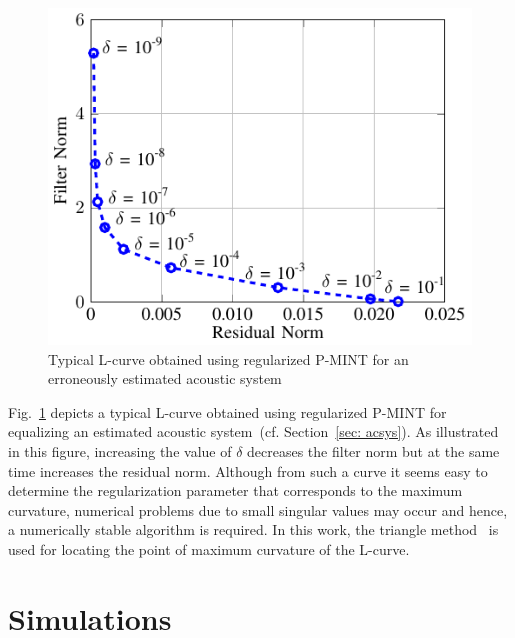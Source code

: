 \documentclass[10pt]{IEEEtran}
\begin{document}
\begin{figure}[t!]
  \centering
  \includegraphics[scale=0.9]{figures/lcurve_ex.pdf}
  \caption{Typical L-curve obtained using regularized P-MINT for an erroneously estimated acoustic system}
  \label{fig: lcurveex}
\end{figure}
Fig.~\ref{fig: lcurveex} depicts a typical L-curve obtained using regularized P-MINT for equalizing an estimated acoustic system~(cf. Section~\ref{sec: acsys}).
As illustrated in this figure, increasing the value of $\delta$ decreases the filter norm but at the same time increases the residual norm.
Although from such a curve it seems easy to determine the regularization parameter that corresponds to the maximum curvature, numerical problems due to small singular values may occur and hence, a numerically stable algorithm is required.
In this work, the triangle method~\cite{Castellanos_2002} is used for locating the point of maximum curvature of the L-curve.

\section{Simulations}
\label{sec: exp}
\end{document}
